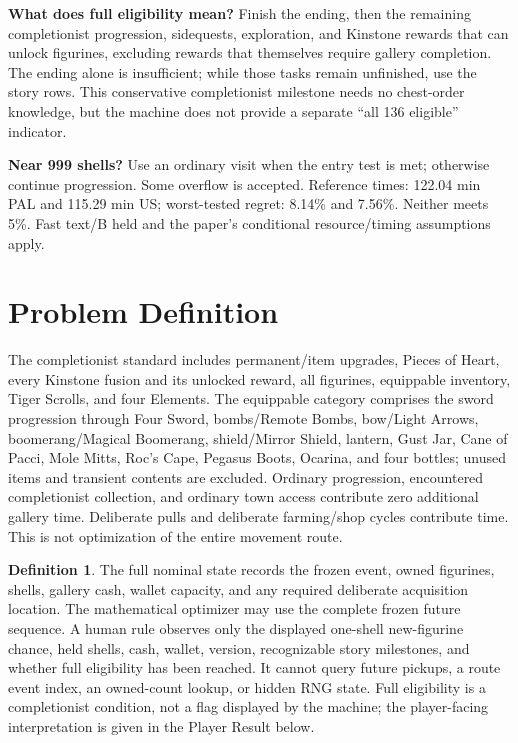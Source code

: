 \documentclass[11pt]{article}
\theoremstyle{definition}\newtheorem{definition}[theorem]{Definition}
\begin{document}
{\begin{minipage}{.94\linewidth}
\textbf{What does full eligibility mean?} Finish the ending, then the remaining completionist progression, sidequests, exploration, and Kinstone rewards that can unlock figurines, excluding rewards that themselves require gallery completion. The ending alone is insufficient; while those tasks remain unfinished, use the story rows. This conservative completionist milestone needs no chest-order knowledge, but the machine does not provide a separate ``all 136 eligible'' indicator.

\textbf{Near 999 shells?} Use an ordinary visit when the entry test is met; otherwise continue progression. Some overflow is accepted. Reference times: 122.04 min PAL and 115.29 min US; worst-tested regret: 8.14\% and 7.56\%. Neither meets 5\%. Fast text/B held and the paper's conditional resource/timing assumptions apply.
\end{minipage}}
\clearpage

\section{Problem Definition}
The completionist standard includes permanent/item upgrades, Pieces of Heart, every Kinstone fusion and its unlocked reward, all figurines, equippable inventory, Tiger Scrolls, and four Elements. The equippable category comprises the sword progression through Four Sword, bombs/Remote Bombs, bow/Light Arrows, boomerang/Magical Boomerang, shield/Mirror Shield, lantern, Gust Jar, Cane of Pacci, Mole Mitts, Roc's Cape, Pegasus Boots, Ocarina, and four bottles; unused items and transient contents are excluded.
Ordinary progression, encountered completionist collection, and ordinary town access contribute zero additional gallery time. Deliberate pulls and deliberate farming/shop cycles contribute time. This is not optimization of the entire movement route.
\begin{definition}
The full nominal state records the frozen event, owned figurines, shells, gallery cash, wallet capacity, and any required deliberate acquisition location. The mathematical optimizer may use the complete frozen future sequence. A human rule observes only the displayed one-shell new-figurine chance, held shells, cash, wallet, version, recognizable story milestones, and whether full eligibility has been reached. It cannot query future pickups, a route event index, an owned-count lookup, or hidden RNG state. Full eligibility is a completionist condition, not a flag displayed by the machine; the player-facing interpretation is given in the Player Result below.
\end{definition}
\end{document}

